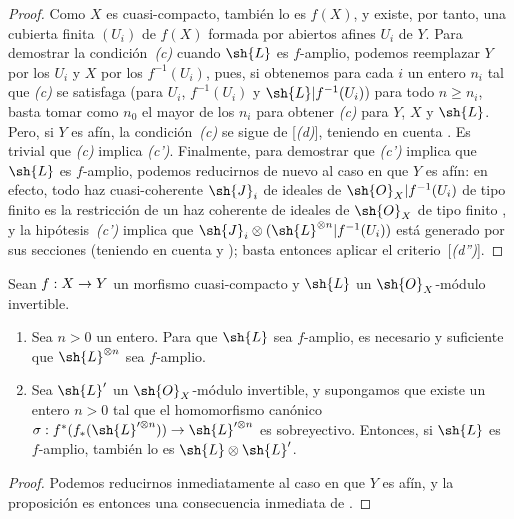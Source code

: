\documentclass[oneside,10pt]{amsart}
\makeatletter
\renewcommand{\geq}{\geqslant}
\newcommand{\ega@arrow}[2]{\mathchoice{#1}{#2}{#2}{#2}}
\renewcommand{\to}{\ega@arrow{\longrightarrow}{\rightarrow}}
\newcommand{\oldpage}[2][]{\marginnote{\normalfont\footnotesize\textbf{#1}~|~#2}\ignorespaces}
\let\EGAOriginalLabel\label
\renewcommand{\label}[1]{\phantomsection\EGAOriginalLabel{#1}}
\makeatother
\begin{document}
\begin{proof}
Como $X$ es cuasi-compacto, también lo es $f(X)$, y existe, por tanto, una cubierta finita $(U_i)$ de $f(X)$ formada por abiertos afines $U_i$ de $Y$.
Para demostrar la condición~\emph{(c)} cuando $\sh{L}$ es $f$-amplio, podemos reemplazar $Y$ por los $U_i$ y $X$ por los $f^{-1}(U_i)$, pues, si obtenemos para cada $i$ un entero $n_i$ tal que \emph{(c)} se satisfaga (para $U_i$, $f^{-1}(U_i)$ y $\sh{L}|f^{-1}(U_i)$) para todo $n\geq n_i$, basta tomar como $n_0$ el mayor de los $n_i$ para obtener \emph{(c)} para $Y$, $X$ y $\sh{L}$.
Pero, si $Y$ es afín, la condición~\emph{(c)} se sigue de [\emph{(d)}], teniendo en cuenta .
Es trivial que \emph{(c)} implica \emph{(c')}.
Finalmente, para demostrar que \emph{(c')} implica que $\sh{L}$ es $f$-amplio, podemos reducirnos de nuevo al caso en que $Y$ es afín:
en efecto, todo haz cuasi-coherente $\sh{J}_i$ de ideales de $\sh{O}_X|f^{-1}(U_i)$ de tipo finito es la restricción de un haz coherente de ideales de $\sh{O}_X$ de tipo finito , y la hipótesis~\emph{(c')} implica que
\oldpage[II]{91}
$\sh{J}_i\otimes(\sh{L}^{\otimes n}|f^{-1}(U_i))$ está generado por sus secciones (teniendo en cuenta  y );
basta entonces aplicar el criterio~[\emph{(d'')}].
\end{proof}

\begin{proposition}[4.6.9]
\label{II.4.6.9}
Sean $f:X\to Y$ un morfismo cuasi-compacto y $\sh{L}$ un $\sh{O}_X$-módulo invertible.
\begin{enumerate}
  \item[\rm{(i)}] Sea $n>0$ un entero.
    Para que $\sh{L}$ sea $f$-amplio, es necesario y suficiente que $\sh{L}^{\otimes n}$ sea $f$-amplio.
  \item[\rm{(ii)}] Sea $\sh{L}'$ un $\sh{O}_X$-módulo invertible, y supongamos que existe un entero $n>0$ tal que el homomorfismo canónico $\sigma:f^*(f_*(\sh{L}'^{\otimes n}))\to\sh{L}'^{\otimes n}$ es sobreyectivo.
    Entonces, si $\sh{L}$ es $f$-amplio, también lo es $\sh{L}\otimes\sh{L}'$.
\end{enumerate}
\end{proposition}

\begin{proof}
Podemos reducirnos inmediatamente al caso en que $Y$ es afín, y la proposición es entonces una consecuencia inmediata de .
\end{proof}
\end{document}
